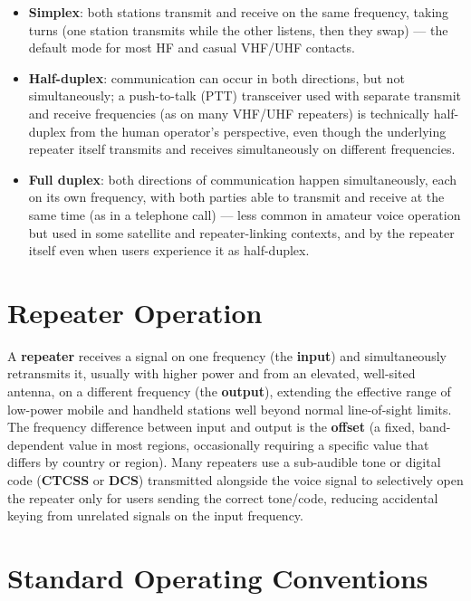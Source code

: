 \begin{itemize}
\item \textbf{Simplex}: both stations transmit and receive on the same
frequency, taking turns (one station transmits while the other
listens, then they swap) --- the default mode for most HF and casual
VHF/UHF contacts.
\item \textbf{Half-duplex}: communication can occur in both directions,
but not simultaneously; a push-to-talk (PTT) transceiver used with
separate transmit and receive frequencies (as on many VHF/UHF
repeaters) is technically half-duplex from the human operator's
perspective, even though the underlying repeater itself transmits and
receives simultaneously on different frequencies.
\item \textbf{Full duplex}: both directions of communication happen
simultaneously, each on its own frequency, with both parties able to
transmit and receive at the same time (as in a telephone call) --- less
common in amateur voice operation but used in some satellite and
repeater-linking contexts, and by the repeater itself even when users
experience it as half-duplex.
\end{itemize}

\section{Repeater Operation}

A \textbf{repeater} receives a signal on one frequency (the
\textbf{input}) and simultaneously retransmits it, usually with higher
power and from an elevated, well-sited antenna, on a different
frequency (the \textbf{output}), extending the effective range of
low-power mobile and handheld stations well beyond normal line-of-sight
limits. The frequency difference between input and output is the
\textbf{offset} (a fixed, band-dependent value in most regions,
occasionally requiring a specific value that differs by country or
region). Many repeaters use a sub-audible tone or digital code
(\textbf{CTCSS} or \textbf{DCS}) transmitted alongside the voice signal
to selectively open the repeater only for users sending the correct
tone/code, reducing accidental keying from unrelated signals on the
input frequency.

\section{Standard Operating Conventions}

